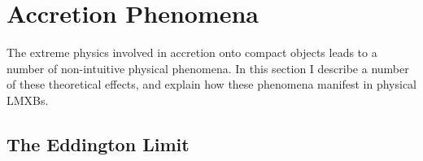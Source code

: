 \section{Accretion Phenomena}

\par The extreme physics involved in accretion onto compact objects leads to a number of non-intuitive physical phenomena.  In this section I describe a number of these theoretical effects, and explain how these phenomena manifest in physical LMXBs.  

\subsection{The Eddington Limit}

\label{sec:edd}

